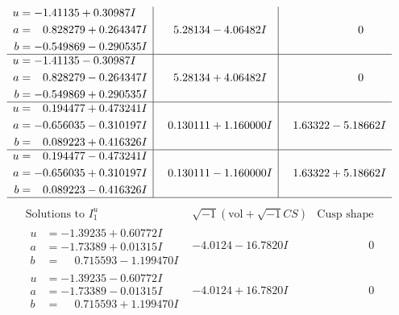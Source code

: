 \documentclass[1p]{elsarticle_modified}
\theoremstyle{definition}
\newcommand{\I}{\sqrt{-1}}
\begin{document}
$$\begin{array}{c|c|c}
\begin{aligned}
u &= -1.41135 + 0.30987 I \\
a &= \phantom{-}0.828279 + 0.264347 I \\
b &= -0.549869 - 0.290535 I\end{aligned}
 & \phantom{-}5.28134 - 4.06482 I & \phantom{-0.000000 } 0 \\ \hline\begin{aligned}
u &= -1.41135 - 0.30987 I \\
a &= \phantom{-}0.828279 - 0.264347 I \\
b &= -0.549869 + 0.290535 I\end{aligned}
 & \phantom{-}5.28134 + 4.06482 I & \phantom{-0.000000 } 0 \\ \hline\begin{aligned}
u &= \phantom{-}0.194477 + 0.473241 I \\
a &= -0.656035 - 0.310197 I \\
b &= \phantom{-}0.089223 + 0.416326 I\end{aligned}
 & \phantom{-}0.130111 + 1.160000 I & \phantom{-}1.63322 - 5.18662 I \\ \hline\begin{aligned}
u &= \phantom{-}0.194477 - 0.473241 I \\
a &= -0.656035 + 0.310197 I \\
b &= \phantom{-}0.089223 - 0.416326 I\end{aligned}
 & \phantom{-}0.130111 - 1.160000 I & \phantom{-}1.63322 + 5.18662 I\\
 \hline 
 \end{array}$$\newpage$$\begin{array}{c|c|c}  
\text{Solutions to }I^u_{1}& \I (\text{vol} + \sqrt{-1}CS) & \text{Cusp shape}\\
 \hline 
\begin{aligned}
u &= -1.39235 + 0.60772 I \\
a &= -1.73389 + 0.01315 I \\
b &= \phantom{-}0.715593 - 1.199470 I\end{aligned}
 & -4.0124 - 16.7820 I & \phantom{-0.000000 } 0 \\ \hline\begin{aligned}
u &= -1.39235 - 0.60772 I \\
a &= -1.73389 - 0.01315 I \\
b &= \phantom{-}0.715593 + 1.199470 I\end{aligned}
 & -4.0124 + 16.7820 I & \phantom{-0.000000 } 0 \\ \hline\begin{aligned}

\end{aligned}
\end{array}$$
\end{document}

